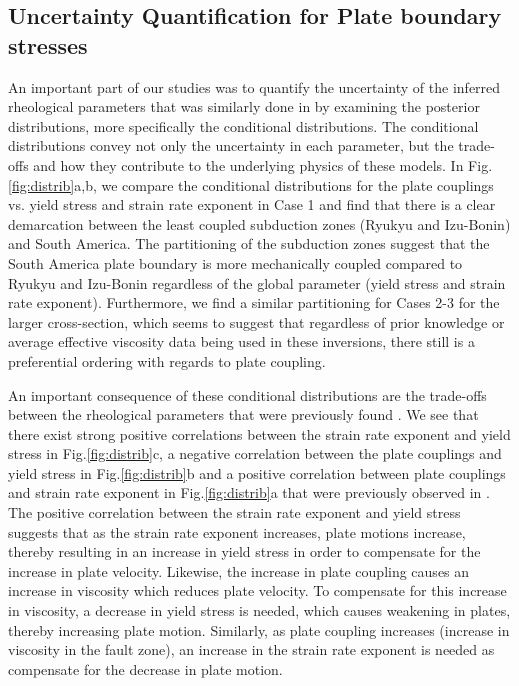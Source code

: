 \documentclass[12pt]{article}
\begin{document}
\subsection{Uncertainty Quantification for Plate boundary stresses}

An important part of our studies was to quantify the uncertainty of the inferred rheological parameters that was similarly done in \citep{ratnaswamy2015adjoint} by examining the posterior distributions, more specifically the conditional distributions. The conditional distributions convey not only the uncertainty in each parameter, but the trade-offs and how they contribute to the underlying physics of these models. In Fig.\ref{fig:distrib}a,b, we compare the conditional distributions for the plate couplings vs. yield stress and strain rate exponent in Case 1 and find that there is a clear demarcation between the least coupled subduction zones (Ryukyu and Izu-Bonin) and South America. The partitioning of the subduction zones suggest that the South America plate boundary is more mechanically coupled compared to Ryukyu and Izu-Bonin regardless of the global parameter (yield stress and strain rate exponent). Furthermore, we find a similar partitioning for Cases 2-3 for the larger cross-section, which seems to suggest that regardless of prior knowledge or average effective viscosity data being used in these inversions, there still is a preferential ordering with regards to plate coupling. 

An important consequence of these conditional distributions are the trade-offs between the rheological parameters that were previously found \citep{ratnaswamy2015adjoint}. We see that there exist strong positive correlations between the strain rate exponent and yield stress in Fig.\ref{fig:distrib}c, a negative correlation between the plate couplings and yield stress in Fig.\ref{fig:distrib}b and a positive correlation between plate couplings and strain rate exponent in Fig.\ref{fig:distrib}a that were previously observed in \citep{ratnaswamy2015adjoint}. The positive correlation between the strain rate exponent and yield stress suggests that as the strain rate exponent increases, plate motions increase, thereby resulting in an increase in yield stress in order to compensate for the increase in plate velocity. Likewise, the increase in plate coupling causes an increase in viscosity which reduces plate velocity.  To compensate for this increase in viscosity, a decrease in yield stress is needed, which causes weakening in plates, thereby increasing plate motion. Similarly, as plate coupling increases (increase in viscosity in the fault zone), an increase in the strain rate exponent is needed as compensate for the decrease in plate motion.  
\end{document}
